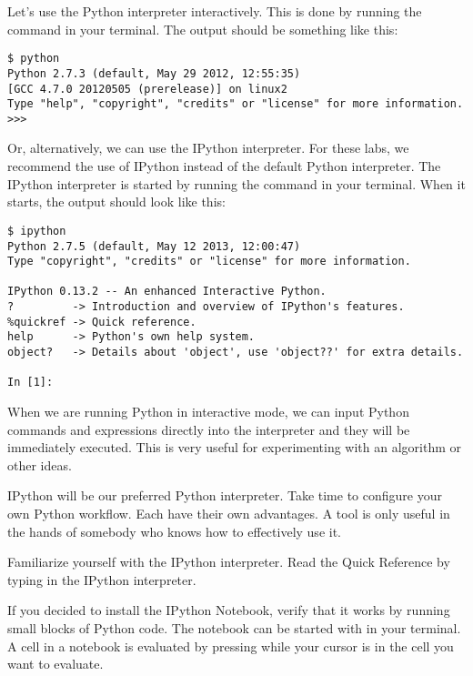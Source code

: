 Let's use the Python interpreter interactively.
This is done by running the command  in your terminal.
The output should be something like this:
\begin{lstlisting}
$ python
Python 2.7.3 (default, May 29 2012, 12:55:35)
[GCC 4.7.0 20120505 (prerelease)] on linux2
Type "help", "copyright", "credits" or "license" for more information.
>>>
\end{lstlisting}
Or, alternatively, we can use the IPython interpreter.
For these labs, we recommend the use of IPython instead of the default Python interpreter.
The IPython interpreter is started by running the command  in your terminal.
When it starts, the output should look like this:
\begin{lstlisting}
$ ipython
Python 2.7.5 (default, May 12 2013, 12:00:47)
Type "copyright", "credits" or "license" for more information.

IPython 0.13.2 -- An enhanced Interactive Python.
?         -> Introduction and overview of IPython's features.
%quickref -> Quick reference.
help      -> Python's own help system.
object?   -> Details about 'object', use 'object??' for extra details.

In [1]:
\end{lstlisting}
When we are running Python in interactive mode, we can input Python commands and expressions directly into the interpreter and they will be immediately executed.
This is very useful for experimenting with an algorithm or other ideas.

IPython will be our preferred Python interpreter.  Take time to configure your own Python
workflow.  Each have their own advantages.  A tool is only useful in the hands of somebody
who knows how to effectively use it.
\begin{problem}
Familiarize yourself with the IPython interpreter.
Read the Quick Reference by typing  in the IPython interpreter.

If you decided to install the IPython Notebook, verify that it works by running small blocks of Python code.
The notebook can be started with  in your terminal.
A cell in a notebook is evaluated by pressing  while your cursor is in the cell you want to evaluate.
\end{problem}
